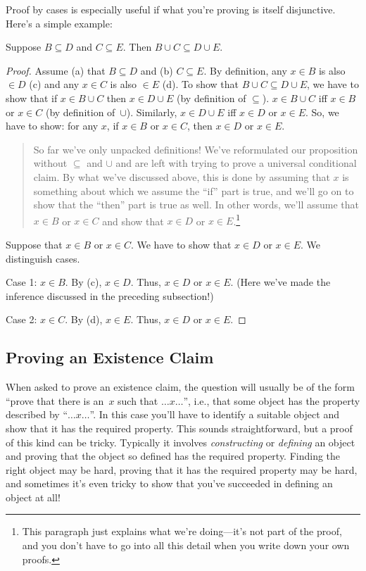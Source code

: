\documentclass[../../../include/open-logic-section]{subfiles}
\begin{document}
Proof by cases is especially useful if what you're proving is itself
disjunctive. Here's a simple example:

\begin{prop}
Suppose $B \subseteq D$ and $C \subseteq E$. Then $B \cup C \subseteq
D \cup E$.
\end{prop}

\begin{proof}
  Assume (a) that $B \subseteq D$ and (b) $C \subseteq E$. By
  definition, any $x \in B$ is also $\in D$ (c) and any $x \in C$ is
  also $\in E$ (d).  To show that $B \cup C \subseteq D \cup E$, we
  have to show that if $x \in B \cup C$ then $x \in D \cup E$ (by
  definition of $\subseteq$). $x \in B \cup C$ iff $x \in B$ or $x \in
  C$ (by definition of~$\cup$). Similarly, $x \in D \cup E$ iff $x \in
  D$ or $x \in E$. So, we have to show: for any $x$, if $x \in B$ or
  $x \in C$, then $x \in D$ or $x \in E$.

  \begin{quote}
  So far we've only unpacked definitions!{} We've reformulated our
  proposition without $\subseteq$ and $\cup$ and are left with trying
  to prove a universal conditional claim. By what we've discussed
  above, this is done by assuming that $x$ is something about which we
  assume the ``if'' part is true, and we'll go on to show that the
  ``then'' part is true as well. In other words, we'll assume that $x
  \in B$ or $x \in C$ and show that $x \in D$ or $x \in
  E$.\footnote{This paragraph just explains what we're doing---it's
    not part of the proof, and you don't have to go into all this
    detail when you write down your own proofs.}
  \end{quote}

  Suppose that $x \in B$ or $x \in C$. We have to show that $x \in D$
  or $x \in E$. We distinguish cases.

  Case 1: $x \in B$. By (c), $x \in D$. Thus, $x \in D$ or $x \in
  E$. (Here we've made the inference discussed in the preceding
  subsection!)
      
  Case 2: $x \in C$. By (d), $x \in E$. Thus, $x \in D$ or $x \in E$.
 \end{proof}


\subsection{Proving an Existence Claim}

When asked to prove an existence claim, the question will usually be
of the form ``prove that there is an~$x$ such that $\dots x \dots$'',
i.e., that some object has the property described by ``$\dots x
\dots$''. In this case you'll have to identify a suitable object and show
that it has the required property. This sounds straightforward, but a
proof of this kind can be tricky. Typically it involves
\emph{constructing} or \emph{defining} an object and proving that the
object so defined has the required property. Finding the right object
may be hard, proving that it has the required property may be hard,
and sometimes it's even tricky to show that you've succeeded in
defining an object at all!{}
\end{document}
